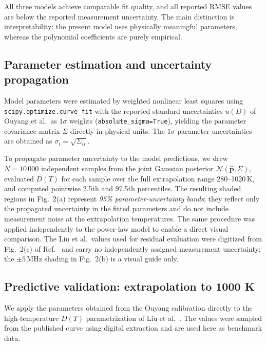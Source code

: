 \documentclass[12pt]{article}
\begin{document}
All three models achieve comparable fit quality, and all reported RMSE values are below the reported measurement uncertainty. The main distinction is interpretability: the present model uses physically meaningful parameters, whereas the polynomial coefficients are purely empirical.

\subsection*{Parameter estimation and uncertainty propagation}

Model parameters were estimated by weighted nonlinear least squares
using \texttt{scipy.optimize.curve\_fit} with the reported standard
uncertainties $u(D)$ of Ouyang et al.\ as $1\sigma$ weights
(\texttt{absolute\_sigma=True}), yielding the parameter covariance
matrix $\Sigma$ directly in physical units.
The $1\sigma$ parameter uncertainties are obtained as
$\sigma_i = \sqrt{\Sigma_{ii}}$.

To propagate parameter uncertainty to the model predictions, we
drew $N = 10\,000$ independent samples from the joint Gaussian
posterior $\mathcal{N}(\hat{\boldsymbol{p}}, \Sigma)$, evaluated
$D(T)$ for each sample over the full extrapolation range
280–1020\,K, and computed pointwise 2.5th and 97.5th percentiles.
The resulting shaded regions in Fig.~2(a) represent
\emph{95\% parameter-uncertainty bands}; they reflect only
the propagated uncertainty in the fitted parameters and do not
include measurement noise at the extrapolation temperatures.
The same procedure was applied independently to the power-law
model to enable a direct visual comparison.
The Liu et al.\ values used for residual evaluation were digitized
from Fig.~2(c) of Ref.~\cite{liu2019} and carry no independently
assigned measurement uncertainty; the $\pm5$\,MHz shading in
Fig.~2(b) is a visual guide only.

\subsection{Predictive validation: extrapolation to 1000 K}
We apply the parameters obtained from the Ouyang calibration directly to the high-temperature $D(T)$ parametrization of Liu et al.~\citep{liu2019}. The values were sampled from the published curve using digital extraction and are used here as benchmark data.
\end{document}
